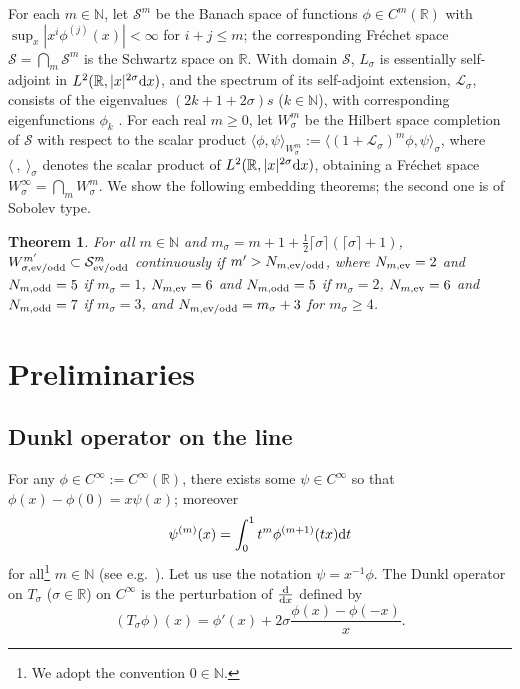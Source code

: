 \documentclass[11pt]{article}
\newtheorem{Theorem}{Theorem}[section]
\newcommand{\R}{\mathbb{R}}
\newcommand{\N}{\mathbb{N}}
\newcommand{\LL}{\mathcal{L}}
\renewcommand{\SS}{\mathcal{S}}
\newcommand{\Cinf}{C^\infty}
\begin{document}
For each $m\in\N$, let $\SS^m$ be the Banach space of functions $\phi\in C^m(\R)$ with \mbox{$\sup_x|x^i\phi^{(j)}(x)|\!<\!\infty$} for $i+j\le m$; the corresponding Fr\'echet space $\SS=\bigcap_m\SS^m$ is the Schwartz space on $\R$. With domain $\SS$, $L_\sigma$ is essentially self-adjoint in $L^2(\R,|x|^{2\sigma}{\rm d}x)$, and the spectrum of its self-adjoint extension, $\LL_\sigma$, consists of the eigenvalues $(2k+1+2\sigma)s$ ($k\in\N$), with corresponding eigenfunctions $\phi_k$  \cite{Rosenblum1994}. For each real $m\ge0$, let $W_\sigma^m$ be the Hilbert space completion of $\SS$ with respect to the scalar product $\langle\phi,\psi\rangle_{W_\sigma^m}:=\langle(1+\LL_\sigma)^m\phi,\psi\rangle_\sigma$, where $\langle\ ,\ \rangle_\sigma$ denotes the scalar product of $L^2(\R,|x|^{2\sigma}{\rm d}x)$, obtaining a Fr\'echet space $W_\sigma^\infty=\bigcap_mW_\sigma^m$. We show the following embedding theorems; the second one is of Sobolev type.
\setcounter{section}{1}
\setcounter{subsection}{0}
\setcounter{subsubsection}{0}
\setcounter{Theorem}{1}
\setcounter{equation}{0}
\begin{Theorem}\label{t:Sobolev}
  For all $m\in\N$ and $m_\sigma=m+1+\frac{1}{2}\lceil\sigma\rceil(\lceil\sigma\rceil+1)$, $W_{\sigma,\text{\rm ev/odd}}^{m'}\subset\SS_{\text{\rm ev/odd}}^m$ continuously if $m'>N_{m,\text{\rm ev/odd}}$, where $N_{m,\text{\rm ev}}=2$ and $N_{m,\text{\rm odd}}=5$ if $m_\sigma=1$, $N_{m,\text{\rm ev}}=6$ and $N_{m,\text{\rm odd}}=5$ if $m_\sigma=2$, $N_{m,\text{\rm ev}}=6$ and $N_{m,\text{\rm odd}}=7$ if $m_\sigma=3$, and $N_{m,\text{\rm ev/odd}}=m_\sigma+3$ for $m_\sigma\ge4$.
\end{Theorem}
\setcounter{section}{1}
\setcounter{subsection}{0}
\setcounter{subsubsection}{0}
\setcounter{Theorem}{4}
\setcounter{equation}{0}
\section{Preliminaries}\label{s:preliminaries}

\subsection{Dunkl operator on the line}\label{ss:D sigma}

For any $\phi\in\Cinf:=\Cinf(\R)$, there exists some $\psi\in\Cinf$ so that $\phi(x)-\phi(0)=x\psi(x)$; moreover
  \begin{gather}\label{psi (m)(x)}
    \psi^{(m)}(x)=\int_0^1t^m\phi^{(m+1)}(tx){\rm d}t
  \end{gather}
for all\footnote{We adopt the convention $0\in\N$.} $m\in\N$ (see e.g.~\cite[Theorem~1.1.9]{Hormander1990-I}). Let us use the notation $\psi=x^{-1}\phi$. The Dunkl operator on $T_\sigma$ ($\sigma\in\R$) on $\Cinf$ is the perturbation of $\frac{{\rm d}}{{\rm d}x}$ def\/ined by
  \[
    (T_\sigma\phi)(x)=\phi'(x)+2\sigma \frac{\phi(x)-\phi(-x)}{x} .
  \]
\end{document}
